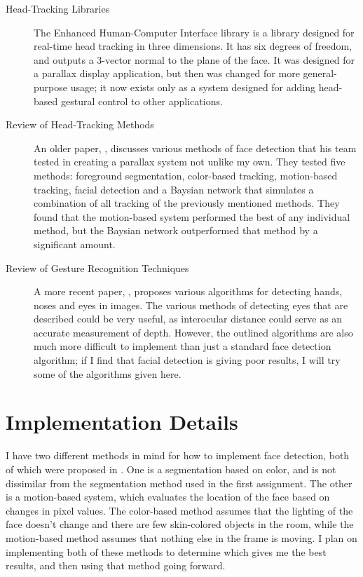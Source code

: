 \begin{description}
\item[Head-Tracking Libraries] The Enhanced Human-Computer Interface
  library \citep{ehci} is a library designed for real-time head
  tracking in three dimensions. It has six degrees of freedom, and
  outputs a 3-vector normal to the plane of the face. It was designed
  for a parallax display application, but then was changed for more
  general-purpose usage; it now exists only as a system designed for
  adding head-based gestural control to other applications.

\item[Review of Head-Tracking Methods] An older paper,
  \citep{parallax}, discusses various methods of face detection that
  his team tested in creating a parallax system not unlike my
  own. They tested five methods: foreground segmentation, color-based
  tracking, motion-based tracking, facial detection and a Baysian
  network that simulates a combination of all tracking of the
  previously mentioned methods. They found that the motion-based
  system performed the best of any individual method, but the Baysian
  network outperformed that method by a significant amount.

\item[Review of Gesture Recognition Techniques] A more recent paper,
  \citep{eyetracking}, proposes various algorithms for detecting
  hands, noses and eyes in images. The various methods of detecting
  eyes that are described could be very useful, as interocular
  distance could serve as an accurate measurement of depth. However,
  the outlined algorithms are also much more difficult to implement
  than just a standard face detection algorithm; if I find that facial
  detection is giving poor results, I will try some of the algorithms
  given here.
\end{description}

\section{Implementation Details}
I have two different methods in mind for how to implement face
detection, both of which were proposed in \citep{parallax}. One is a
segmentation based on color, and is not dissimilar from the
segmentation method used in the first assignment. The other is a
motion-based system, which evaluates the location of the face based on
changes in pixel values. The color-based method assumes that the
lighting of the face doesn't change and there are few skin-colored
objects in the room, while the motion-based method assumes that
nothing else in the frame is moving. I plan on implementing both of
these methods to determine which gives me the best results, and then
using that method going forward.


